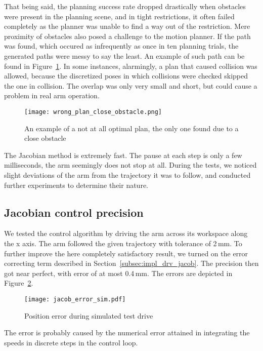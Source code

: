 \documentclass[buriama8_dp.tex]{subfiles}
\begin{document}
That being said, the planning success rate dropped drastically when obstacles were present in the planning scene, and in tight restrictions, it often failed completely as the planner was unable to find a way out of the restriction. Mere proximity of obstacles also posed a challenge to the motion planner. If the path was found, which occured as infrequently as once in ten planning trials, the generated paths were messy to say the least. An example of such path can be found in Figure~\ref{fig:collision_plan}. In some instances, alarmingly, a plan that caused collision was allowed, because the discretized poses in which collisions were checked skipped the one in collision. The overlap was only very small and short, but could cause a problem in real arm operation.

\begin{figure}[htp]
  \centering
  \texttt{[image: wrong\_plan\_close\_obstacle.png]}
  \caption{An example of a not at all optimal plan, the only one found due to a close obstacle}
  \label{fig:collision_plan}
\end{figure}


The Jacobian method is extremely fast. The pause at each step is only a few milliseconds, the arm seemingly does not stop at all.  During the tests, we noticed slight deviations of the arm from the trajectory it was to follow, and conducted further experiments to determine their nature.

\subsection{Jacobian control precision}
\label{subsec:label}


We tested the control algorithm by driving the arm across its workspace along the \m x axis. The arm followed the given trajectory with tolerance of 2\,mm. To further improve the here completely satisfactory result, we turned on the error correcting term described in Section~\ref{subsec:impl_drv_jacob}. The precision then got near perfect, with error of at most 0.4\,mm. The errors are depicted in Figure~\ref{fig:err_jac_sim}. 

\begin{figure}[ht]
  \centering
  \texttt{[image: jacob\_error\_sim.pdf]}
  \caption{Position error during simulated test drive}
  \label{fig:err_jac_sim}
\end{figure}

The error is probably caused by the numerical error attained in integrating the speeds in discrete steps in the control loop.
\end{document}
